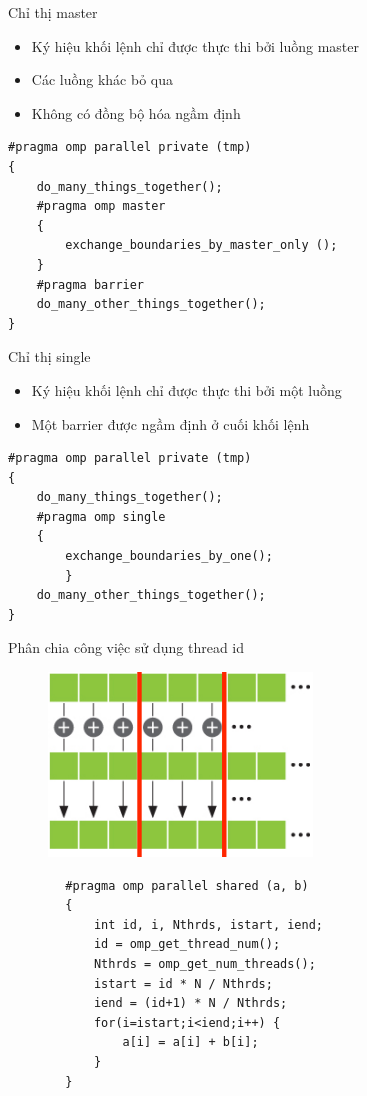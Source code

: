 \documentclass[10pt]{beamer}
\theoremstyle{remark}
\numberwithin{algocf}{section}
\numberwithin{equation}{section}
\numberwithin{dl}{section}
\numberwithin{figure}{section}
\begin{document}
\begin{frame}[fragile]{Chỉ thị master}
    \begin{itemize}
        \item Ký hiệu khối lệnh chỉ được thực thi bởi luồng master
        \item Các luồng khác bỏ qua
        \item Không có đồng bộ hóa ngầm định
    \end{itemize}
    \begin{verbatim}
#pragma omp parallel private (tmp)
{
    do_many_things_together();
    #pragma omp master
    { 
        exchange_boundaries_by_master_only (); 
    }
    #pragma barrier
    do_many_other_things_together();
} 
    \end{verbatim}
\end{frame}

\begin{frame}[fragile]{Chỉ thị single}
    \begin{itemize}
        \item Ký hiệu khối lệnh chỉ được thực thi bởi một luồng
        \item Một barrier được ngầm định ở cuối khối lệnh
    \end{itemize}
    \begin{verbatim}
#pragma omp parallel private (tmp)
{
    do_many_things_together();
    #pragma omp single
    { 
        exchange_boundaries_by_one(); 
        }
    do_many_other_things_together();
}
    \end{verbatim}
\end{frame}

\begin{frame}{Phân chia công việc sử dụng thread id}
    \begin{figure}[H]
        \centering
        \includegraphics[width=0.3\linewidth]{figures/OpenMP/Distribute.png}
    \end{figure}
    \begin{verbatim}
        #pragma omp parallel shared (a, b)
        {
            int id, i, Nthrds, istart, iend;
            id = omp_get_thread_num();
            Nthrds = omp_get_num_threads();
            istart = id * N / Nthrds;
            iend = (id+1) * N / Nthrds;
            for(i=istart;i<iend;i++) { 
                a[i] = a[i] + b[i]; 
            }
        } 
    \end{verbatim}
\end{frame}
\end{document}
